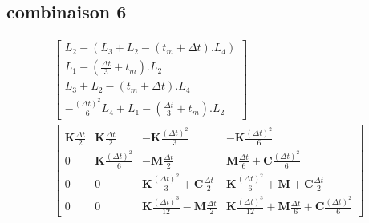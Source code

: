 \documentclass[12pt,a4paper]{report}
\begin{document}
\subsection{combinaison 6}
\begin{equation}
\begin{array}{c}
	\begin{bmatrix}	
		  L_2 - (L_3 + L_2 - (t_m+\Delta t).L_4)
		\\L_1 - \left( \frac{\Delta t}{3} + t_m \right).L_2
		\\ L_3 + L_2 - (t_m+\Delta t).L_4
		\\ -\frac{(\Delta t)^2}{6} L_4 
			+ L_1 
			- \left( \frac{\Delta t}{3} + t_m \right).L_2
	\end{bmatrix}
	\\
		\begin{bmatrix}   
		   		\mathbf{K} \frac{\Delta t}{2}
			&
		   		\mathbf{K} \frac{\Delta t}{2} 
		   	&
			   	-\mathbf{K} \frac{(\Delta t)^2}{3} 
		   	&
		   		-\mathbf{K} \frac{(\Delta t)^2}{6} 
		\\ 	     
			   0 
			&
			   \mathbf{K} \frac{(\Delta t)^2}{6}
		   	&   
			   -\mathbf{M}
			   		\frac{\Delta t}{2}   
			&
			   \mathbf{M}	\frac{ \Delta t}{6} 
			   +\mathbf{C} \frac{(\Delta t)^2}{6} 
		\\   
		   		0
		   	& 
		   		0
		   	&
			   	\mathbf{K}
			   		\frac{(\Delta t)^2}{3} 
		   		+\mathbf{C} \frac{\Delta t}{2}
		   	&
		   		\mathbf{K} \frac{(\Delta t)^2}{6} 
		   		+\mathbf{M} 
			   	+\mathbf{C} \frac{\Delta t}{2}
		\\    
		   		0
		   	&
		   		0
		   	&
		   		\mathbf{K} \frac{(\Delta t)^3}{12}
		   		-\mathbf{M}
			   		\frac{\Delta t}{2} 
		   	&
		   		\mathbf{K} \frac{(\Delta t)^3}{12}
		   		+\mathbf{M} \frac{\Delta t}{6} 
			   +\mathbf{C} \frac{(\Delta t)^2}{6} 
	\end{bmatrix}
\end{array}
\end{equation}
\end{document}
